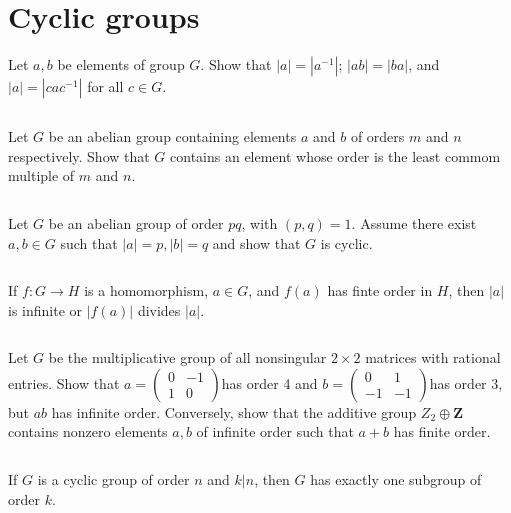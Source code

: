 \section{Cyclic groups}
\begin{ex}
    Let $a,b$ be elements of group $G$. Show that $\left| a \right| =\left| a^{-1} \right| $; $\left| ab \right| =\left| ba \right| $, and $\left| a \right| =\left| cac^{-1} \right| $ for all $c\in G$.
\end{ex}

$$ $$

\begin{ex}
    Let $G$ be an abelian group containing elements $a$ and $b$ of orders $m$ and $n$ respectively. Show that $G$ contains an element whose order is the least commom multiple of $m$ and $n$.
\end{ex}

$$ $$

\begin{ex}
    Let $G$ be an abelian group of order $pq$, with $(p,q)=1$. Assume there exist $a,b\in G$ such that $\left| a \right| =p, \left| b \right| =q$ and show that $G$ is cyclic.
\end{ex}

$$ $$

\begin{ex}
    If $f:G\to H$ is a homomorphism, $a\in G$, and $f(a)$ has finte order in $H$, then $\left| a \right| $ is infinite or $\left| f(a) \right| $ divides $\left| a \right| $.
\end{ex}

$$ $$

\begin{ex}
    Let $G$ be the multiplicative group of all nonsingular $2\times 2$ matrices with rational entries. Show that $a=\begin{pmatrix}
        0 & -1\\1 & 0
    \end{pmatrix}$has order 4 and $b=\begin{pmatrix}
        0& 1\\-1&-1
    \end{pmatrix}$has order 3, but $ab$ has infinite order. Conversely, show that the additive group $Z_{2}\oplus \mathbf{Z}$ contains nonzero elements $a,b$ of infinite order such that $a+b$ has finite order. 
\end{ex}

$$ $$

\begin{ex}
    If $G$ is a cyclic group of order $n$ and $k| n$, then $G$ has exactly one subgroup of order $k$.
\end{ex}

